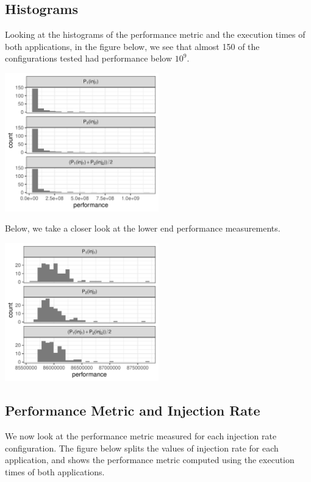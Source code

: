 \documentclass[a4paper]{article}
\begin{document}
\subsection{Histograms}
\label{sec:org7050a16}
Looking at the  histograms of the performance metric and  the execution times of
both  applications,  in  the  figure  below,  we see  that  almost  150  of  the
configurations tested had performance below \(10^{9}\).

\begin{center}
\includegraphics[width=0.5\textwidth]{./img/2_apps_min_mean_time/rs_20_samples_10_iterations_histogram.pdf}
\end{center}

Below, we take a closer look at the lower end performance measurements.

\begin{center}
\includegraphics[width=0.5\textwidth]{./img/2_apps_min_mean_time/rs_20_samples_10_iterations_histogram_cut.pdf}
\end{center}

\subsection{Performance Metric and Injection Rate}
\label{sec:orge7d9b4d}
We  now  look  at  the  performance metric  measured  for  each  injection  rate
configuration.  The  figure below splits the  values of injection rate  for each
application, and shows the performance metric computed using the execution times
of both applications.
\end{document}
